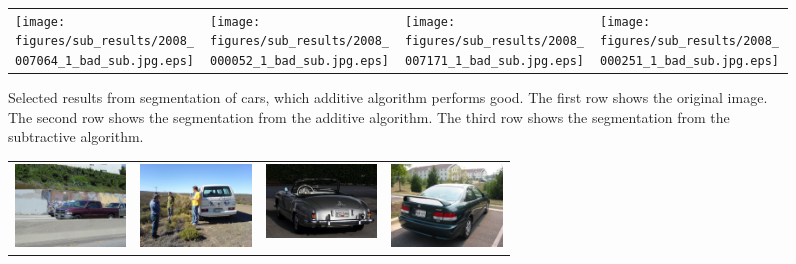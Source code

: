 \documentclass[10pt,twocolumn,letterpaper]{article}
\begin{document}
\begin{figure}[p]
\begin{tabular}{ p{3cm} p{3cm} p{3cm} p{3cm} }
\texttt{[image: figures/sub\_results/2008\_007064\_1\_bad\_sub.jpg.eps]} &
\texttt{[image: figures/sub\_results/2008\_000052\_1\_bad\_sub.jpg.eps]} &
\texttt{[image: figures/sub\_results/2008\_007171\_1\_bad\_sub.jpg.eps]} &
\texttt{[image: figures/sub\_results/2008\_000251\_1\_bad\_sub.jpg.eps]} \\
\end{tabular}
\caption{Selected results from segmentation of cars, which additive algorithm performs good.
  The first row shows the original image.  The second row shows
the segmentation from the additive algorithm.  The third row shows
the segmentation from the subtractive algorithm.}
\label{fig:car_good_results}
\end{figure}


\begin{figure}[p]
\centering
\begin{tabular}{ p{3cm} p{3cm} p{3cm} p{3cm} }
\includegraphics[width=2.95cm]{figures/add_res/car/bad/2008_001961.jpg.eps} &
\includegraphics[width=2.95cm]{figures/add_res/car/bad/2008_003132.jpg.eps} &
\includegraphics[width=2.95cm]{figures/add_res/car/bad/2008_004312.jpg.eps} &
\includegraphics[width=2.95cm]{figures/add_res/car/bad/2008_004414.jpg.eps} \\


\end{tabular}
\end{figure}
\end{document}

